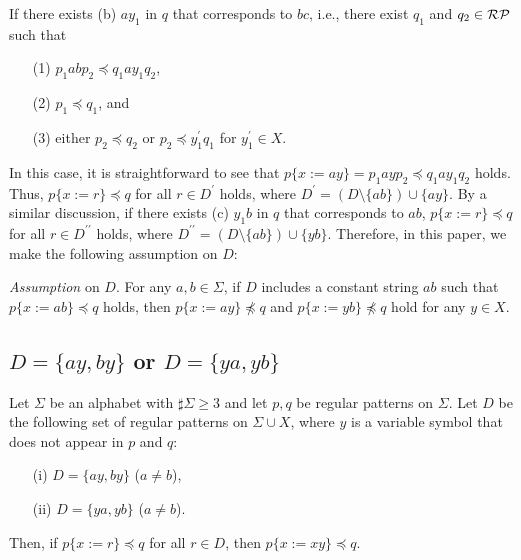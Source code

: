 \noindent
If there exists (b) $ay_{1}$ in $q$ that corresponds to $bc$, i.e., there exist $q_{1}$ and $q_{2}\in \mathcal{RP}$ such that
  \begin{enumerate}
  \item[(1)] $p_{1}abp_{2} \preceq q_{1}ay_{1}q_{2}$, 
  \item[(2)] $p_{1} \preceq q_{1}$, and
  \item[(3)] either $p_{2} \preceq q_{2}$ or $p_{2} \preceq y_{1}^{\prime}q_{1}$ for $y_{1}^{\prime}\in X$.
  \end{enumerate}
In this case, it is straightforward to see that $p\{x:=ay\} = p_{1}ayp_{2} \preceq q_{1}ay_{1}q_{2}$ holds.
Thus, $p \{ x := r \} \preceq q$ for all $r \in D^{\prime}$ holds, where $D^{\prime} = (D \setminus \{ab\}) \cup \{ay\}$.
By a similar discussion, if there exists (c) $y_{1}b$ in $q$ that corresponds to $ab$, $p \{ x := r \} \preceq q$ for all $r \in D^{\prime\prime}$ holds, where $D^{\prime\prime} = (D \setminus \{ab\}) \cup \{yb\}$.
Therefore, in this paper, we make the following assumption on $D$:

\smallskip

\noindent
\textit{Assumption} on $D$.
For any $a,b \in \Sigma$, if $D$ includes a constant string $ab$ such that $p \{ x := ab \} \preceq q$ holds, then $p \{ x := ay \} \not\preceq q$ and $p \{ x := yb \} \not\preceq q$ hold for any $y \in X$.


\subsection{$D=\{ ay, by \}$ or $D=\{ ya, yb \}$}\label{subsec:d2}

\begin{lem}\label{lem:twovariables}
Let $\Sigma$ be an alphabet with $\sharp\Sigma \ge 3$ and let $p,q$ be regular patterns on $\Sigma$.
Let $D$ be the following set of regular patterns on $\Sigma\cup X$, where $y$ is a variable symbol that does not appear in $p$ and $q$:
\begin{enumerate}
\item[{\rm (i)}] $D=\{ ay, by \}$ ($a \not= b$),
\item[{\rm (ii)}] $D=\{ ya, yb \}$ ($a \not= b$).
\end{enumerate}
Then, if $p \{ x := r \} \preceq q$ for all $r \in D$, then $p \{ x := xy \} \preceq q$.
\end{lem}

